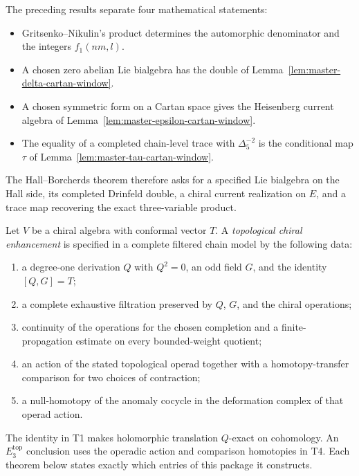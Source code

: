 \begin{remark}
\label{rem:master-hb-cartan-window-synthesis}
The preceding results separate four mathematical statements:
\begin{itemize}[noitemsep]
\item Gritsenko--Nikulin's product determines the automorphic
denominator and the integers $f_1(nm,l)$.
\item A chosen zero abelian Lie bialgebra has the double of
Lemma~\ref{lem:master-delta-cartan-window}.
\item A chosen symmetric form on a Cartan space gives the Heisenberg
current algebra of Lemma~\ref{lem:master-epsilon-cartan-window}.
\item The equality of a completed chain-level trace with
$\Delta_5^{-2}$ is the conditional map $\tau$ of
Lemma~\ref{lem:master-tau-cartan-window}.
\end{itemize}
The Hall--Borcherds theorem therefore asks for a specified Lie
bialgebra on the Hall side, its completed Drinfeld double, a chiral
current realization on $E$, and a trace map recovering the exact
three-variable product.
\end{remark}

\begin{convention}
\label{conv:master-topologisation}
Let $V$ be a chiral algebra with conformal vector $T$.  A
\emph{topological chiral enhancement} is specified in a complete
filtered chain model by the following data:
\begin{enumerate}[label=\textup{(T\arabic*)}]
\item a degree-one derivation $Q$ with $Q^2=0$, an odd field $G$, and
the identity $[Q,G]=T$;
\item a complete exhaustive filtration preserved by $Q$, $G$, and the
chiral operations;
\item continuity of the operations for the chosen completion and a
finite-propagation estimate on every bounded-weight quotient;
\item an action of the stated topological operad together with a
homotopy-transfer comparison for two choices of contraction;
\item a null-homotopy of the anomaly cocycle in the deformation
complex of that operad action.
\end{enumerate}
The identity in T1 makes holomorphic translation $Q$-exact on
cohomology.  An $E_3^{\mathrm{top}}$ conclusion uses the operadic
action and comparison homotopies in T4.  Each theorem below states
exactly which entries of this package it constructs.
\end{convention}

